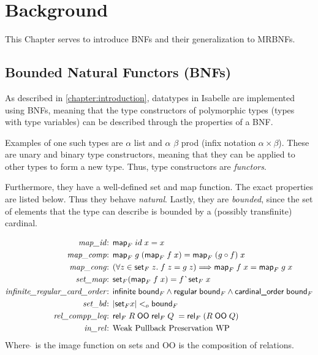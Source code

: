 
\chapter{Background}
\label{chapter:background}

  This Chapter serves to introduce \acp{BNF} and their generalization to \acp{MRBNF}. 
  \section{Bounded Natural Functors (BNFs)}
    As described in \autoref{chapter:introduction}, datatypes in Isabelle are implemented using \acp{BNF}, meaning that the type constructors of polymorphic types (types with type variables) can be described through the properties of a \ac{BNF}.

    Examples of one such types are \textsf{$\alpha$ list} and \textsf{$\alpha$ $\beta$ prod} (infix notation \textsf{$\alpha \times \beta$}). These are unary and binary type constructors, meaning that they can be applied to other types to form a new type. Thus, type constructors are \textit{functors}. 
    
    Furthermore, they have a well-defined set and map function. The exact properties are listed below.
    Thus they behave \textit{natural}. Lastly, they are \textit{bounded}, since the set of elements that the type can describe is bounded by a (possibly transfinite) cardinal.

    \begin{align}
      \text{\textit{map\_id}: }& \text{\textsf{map}}_F\; id\; x = x\\
      \text{\textit{map\_comp}: }& \text{\textsf{map}}_F\; g\; (\text{\textsf{map}}_F\; f\; x) = \text{\textsf{map}}_F\; (g \circ f)\; x\\
      \text{\textit{map\_cong}: }& (\forall z \in \text{\textsf{set}}_F\; z.\; f\; z = g\; z) \Longrightarrow 
        \text{\textsf{map}}_F\; f\; x = \text{\textsf{map}}_F\; g\; x\\
      \text{\textit{set\_map}: }& \text{\textsf{set}}_F (\text{\textsf{map}}_F\; f\; x) = f\; \grave{}\; \text{\textsf{set}}_F\; x\\
      \text{\textit{infinite\_regular\_card\_order}: }& \text{\textsf{infinite}}\; \text{\textsf{bound}}_F \land 
        \text{\textsf{regular}}\; \text{\textsf{bound}}_F \land 
        \text{\textsf{cardinal\_order}}\; \text{\textsf{bound}}_F\\
      \text{\textit{set\_bd}: }& | \text{\textsf{set}}_F x | <_o \text{\textsf{bound}}_F\\
      \text{\textit{rel\_compp\_leq}: }& \text{\textsf{rel}}_F\; R\; \text{\textsf{OO}}\; \text{\textsf{rel}}_F\; Q\; = 
        \text{\textsf{rel}}_F\; (R\; \text{\textsf{OO}}\; Q)\\
      \text{\textit{in\_rel}: }& \text{Weak Pullback Preservation WP}
    \end{align}
    Where $\grave{}$ is the image function on sets and \textsf{OO} is the composition of relations. %

